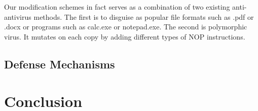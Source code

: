 \documentclass[11pt]{article}
\begin{document}
Our modification schemes in fact serves as a combination of two existing anti-antivirus methods. The first is to disguise as popular file formats such as .pdf or .docx or programs such as calc.exe or notepad.exe. The second is polymorphic virus. It mutates on each copy by adding different types of NOP instructions.

\subsection{Defense Mechanisms}

\section{Conclusion}






\end{document}
